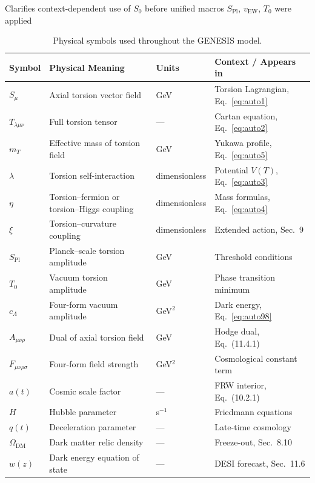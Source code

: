 \documentclass{article}
\newcommand{\Splanck}{\ensuremath{S_{\mathrm{Pl}}}}
\newcommand{\vEW}{\ensuremath{v_{\mathrm{EW}}}}
\begin{document}
Clarifies context-dependent use of $S_0$ before unified macros $\Splanck$, $\vEW$, $T_0$ were applied

\begin{table}[h!]
\centering
\caption{Physical symbols used throughout the GENESIS model.}
\begin{tabular}{llll}
\toprule
\textbf{Symbol} & \textbf{Physical Meaning} & \textbf{Units} & \textbf{Context / Appears in} \\
\midrule
$S_\mu$ & Axial torsion vector field & GeV & Torsion Lagrangian, Eq.~\ref{eq:auto1} \\
$T_{\lambda\mu\nu}$ & Full torsion tensor & — & Cartan equation, Eq.~\ref{eq:auto2} \\
$m_T$ & Effective mass of torsion field & GeV & Yukawa profile, Eq.~\ref{eq:auto5} \\
$\lambda$ & Torsion self-interaction & dimensionless & Potential $V(T)$, Eq.~\ref{eq:auto3} \\
$\eta$ & Torsion–fermion or torsion–Higgs coupling & dimensionless & Mass formulas, Eq.~\ref{eq:auto4} \\
$\xi$ & Torsion–curvature coupling & dimensionless & Extended action, Sec.~9 \\
$S_{\text{Pl}}$ & Planck–scale torsion amplitude & GeV & Threshold conditions \\
$T_0$ & Vacuum torsion amplitude & GeV & Phase transition minimum \\
$c_\Lambda$ & Four-form vacuum amplitude & GeV$^2$ & Dark energy, Eq.~\ref{eq:auto98} \\
$A_{\mu\nu\rho}$ & Dual of axial torsion field & GeV & Hodge dual, Eq.~(11.4.1) \\
$F_{\mu\nu\rho\sigma}$ & Four-form field strength & GeV$^2$ & Cosmological constant term \\
$a(t)$ & Cosmic scale factor & — & FRW interior, Eq.~(10.2.1) \\
$H$ & Hubble parameter & s$^{-1}$ & Friedmann equations \\
$q(t)$ & Deceleration parameter & — & Late-time cosmology \\
$\Omega_{\text{DM}}$ & Dark matter relic density & — & Freeze-out, Sec.~8.10 \\
$w(z)$ & Dark energy equation of state & — & DESI forecast, Sec.~11.6 \\
\bottomrule
\end{tabular}
\end{table}


\clearpage
\end{document}
